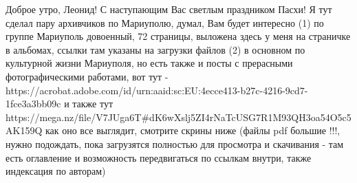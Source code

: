 
Доброе утро, Леонид!  С наступающим Вас светлым праздником
Пасхи! Я тут сделал пару архивчиков по Мариуполю, думал, Вам будет интересно
(1) по группе Мариуполь довоенный, 72 страницы, выложена здесь у меня на
страничке в альбомах, ссылки там указаны на загрузки файлов (2) в основном по
культурной жизни Мариуполя, но есть также и посты с прерасными фотографическими
работами, вот тут -
https://acrobat.adobe.com/id/urn:aaid:sc:EU:4ecce413-b27c-4216-9cd7-1fce3a3bb09c
и также тут
https://mega.nz/file/V7JUga6T#dK6wXslj5ZI4rNaTcUSG7R1M93QH3oa54O5c5AK159Q как
оно все выглядит, смотрите скрины ниже (файлы pdf большие !!!, нужно подождать,
пока загрузятся полностью для просмотра и скачивания - там есть оглавление и
возможность передвигаться по ссылкам внутри, также индексация по авторам)
